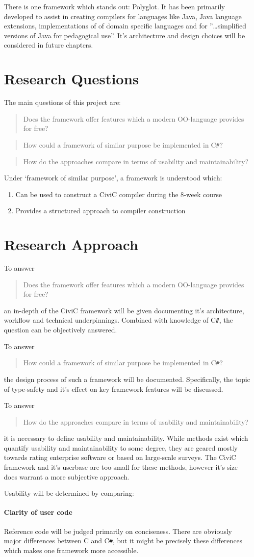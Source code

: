 \documentclass[twoside,openright]{uva-bachelor-thesis}
\newcommand{\cs}{C\texttt{\#}\xspace}
\newcommand\researchquestionformat[1]{\begin{quote}#1\end{quote}}
\newcommand\firstquestion{\researchquestionformat{Does the framework offer features which a modern OO-language provides for free?}}
\newcommand\secondquestion{\researchquestionformat{How could a framework of similar purpose be implemented in \cs?}}
\newcommand\thirdquestion{\researchquestionformat{How do the approaches compare in terms of usability and maintainability?}}
\begin{document}
		There is one framework which stands out: Polyglot\cite{polyglot}. It has been primarily developed to assist in creating compilers for languages like Java, Java language extensions, implementations of of domain specific languages and for ''\ldots simplified versions of Java for pedagogical use''. It's architecture and design choices will be considered in future chapters.
		
		
	\section{Research Questions}
		The main questions of this project are:
		\firstquestion
		\secondquestion
		\thirdquestion
		
		Under `framework of similar purpose', a framework is understood which:
		\begin{enumerate}
			\item Can be used to construct a CiviC compiler during the 8-week course
			\item Provides a structured approach to compiler construction
		\end{enumerate}

	
	\section{Research Approach}
		To answer \firstquestion an in-depth of the CiviC framework will be given documenting it's architecture, workflow and technical underpinnings. Combined with knowledge of \cs, the question can be objectively answered.
		
		To answer \secondquestion the design process of such a framework will be documented. Specifically, the topic of type-safety and it's effect on key framework features will be discussed.
		
		To answer \thirdquestion it is necessary to define usability and maintainability. While methods exist which quantify usability and maintainability to some degree, they are geared mostly towards rating enterprise software or based on large-scale surveys. The CiviC framework and it's userbase are too small for these methods, however it's size does warrant a more subjective approach.
		
		Usability will be determined by comparing:
		\paragraph{Clarity of user code}
			Reference code will be judged primarily on conciseness. There are obviously major differences between C and \cs, but it might be precisely these differences which makes one framework more accessible.
		
\end{document}
